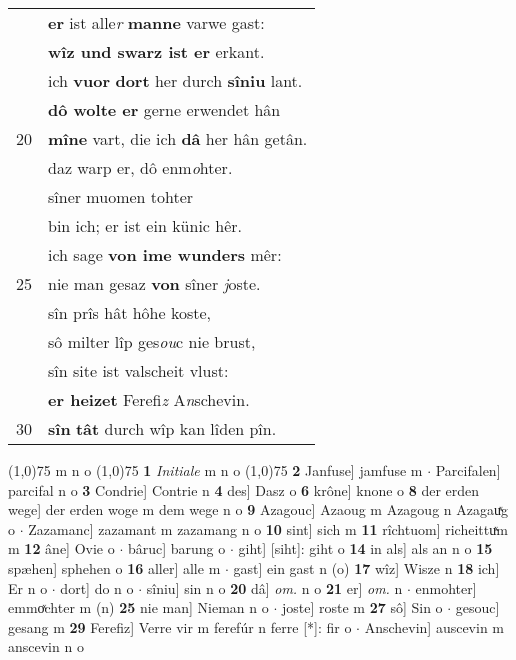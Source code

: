 \documentclass[8pt,a4paper,notitlepage]{article}
\begin{document}
\begin{table}[ht]
\begin{minipage}[t]{0.5\linewidth}
\begin{tabular}{rl}
 & \textbf{er} ist alle\textit{r} \textbf{manne} varwe gast:\\ 
 & \textbf{wîz und swarz ist er} erkant.\\ 
 & ich \textbf{vuor} \textbf{dort} her durch \textbf{sîniu} lant.\\ 
 & \textbf{dô wolte er} gerne erwendet hân\\ 
20 & \textbf{mîne} vart, die ich \textbf{dâ} her hân getân.\\ 
 & daz warp er, dô enm\textit{o}hter.\\ 
 & sîner muomen tohter\\ 
 & bin ich; er ist ein künic hêr.\\ 
 & ich sage \textbf{von ime wunders} mêr:\\ 
25 & nie man gesaz \textbf{von} sîner \textit{j}oste.\\ 
 & sîn prîs hât hôhe koste,\\ 
 & sô milter lîp ges\textit{ou}c nie brust,\\ 
 & sîn site ist valscheit vlust:\\ 
 & \textbf{er heizet} Ferefi\textit{z} A\textit{n}schevin.\\ 
30 & \textbf{sîn} \textbf{tât} durch wîp kan lîden pîn.\\ 
\end{tabular}
\scriptsize
\line(1,0){75} \newline
m n o \newline
\line(1,0){75} \newline
\textbf{1} \textit{Initiale} m n o  \newline
\line(1,0){75} \newline
\textbf{2} Janfuse] jamfuse m  $\cdot$ Parcifalen] parcifal n o \textbf{3} Condrie] Contrie n \textbf{4} des] Dasz o \textbf{6} krône] knone o \textbf{8} der erden wege] der erden woge m dem wege n o \textbf{9} Azagouc] Azaoug m Azagoug n Azagauͯg o  $\cdot$ Zazamanc] zazamant m zazamang n o \textbf{10} sint] sich m \textbf{11} rîchtuom] richeittuͯm m \textbf{12} âne] Ovie o  $\cdot$ bâruc] barung o  $\cdot$ giht] [siht]: giht o \textbf{14} in als] als an n o \textbf{15} spæhen] sphehen o \textbf{16} aller] alle m  $\cdot$ gast] ein gast n (o) \textbf{17} wîz] Wisze n \textbf{18} ich] Er n o  $\cdot$ dort] do n o  $\cdot$ sîniu] sin n o \textbf{20} dâ] \textit{om.} n o \textbf{21} er] \textit{om.} n  $\cdot$ enmohter] emmoͯchter m (n) \textbf{25} nie man] Nieman n o  $\cdot$ joste] roste m \textbf{27} sô] Sin o  $\cdot$ gesouc] gesang m \textbf{29} Ferefiz] Verre vir m ferefúr n ferre [*]: fir o  $\cdot$ Anschevin] auscevin m anscevin n o \newline
\end{minipage}
\end{table}
\end{document}

